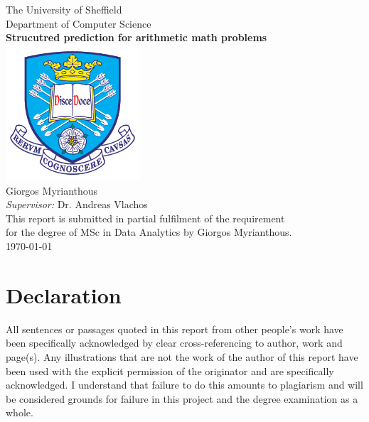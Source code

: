\documentclass[11pt,oneside]{book}
\begin{document}
\frontmatter

\begin{titlepage}

\begin{center}
{\LARGE The University of Sheffield}\\[0.5cm]
{\LARGE Department of Computer Science}\\[1.5cm]

\linespread{1.2}\huge {\bfseries Strucutred prediction for arithmetic math problems}\\[1.5cm]
\linespread{1}
\includegraphics[width=5cm]{images/tuoslogo.png}\\[1cm]
{\Large Giorgos Myrianthous}\\[0.2cm]
{\large \emph{Supervisor:} Dr. Andreas Vlachos}\\[2cm]
\large This report is submitted in partial fulfilment  of the requirement\\ for the degree of MSc in Data Analytics by Giorgos Myrianthous.\\[1.0cm] 

\today
\end{center}

\end{titlepage}


\newpage
\chapter*{\Large Declaration}


All sentences or passages quoted in this report from other people's work have been specifically acknowledged by clear cross-referencing to author, work and page(s). Any illustrations that are not the work of the author of this report have been used with the explicit permission of the originator and are specifically acknowledged. I understand that failure to do this amounts to plagiarism and will be considered grounds for failure in this project and the degree examination as a whole.\\[1cm]
\end{document}
